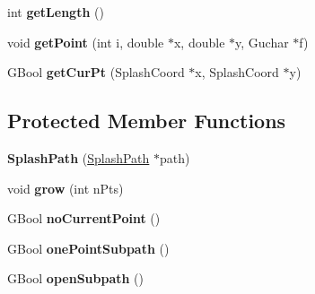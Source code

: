 \begin{DoxyCompactItemize}
\item 
\mbox{\label{class_splash_path_a14f01d774a1395441ddea6f189c72cfe}} 
int {\bfseries get\+Length} ()
\item 
\mbox{\label{class_splash_path_a73ee1734e488eb07ba15084ba93b9964}} 
void {\bfseries get\+Point} (int i, double $\ast$x, double $\ast$y, Guchar $\ast$f)
\item 
\mbox{\label{class_splash_path_aed1a1d48b1af67c88c6edd853c009830}} 
G\+Bool {\bfseries get\+Cur\+Pt} (Splash\+Coord $\ast$x, Splash\+Coord $\ast$y)
\end{DoxyCompactItemize}
\subsection*{Protected Member Functions}
\begin{DoxyCompactItemize}
\item 
\mbox{\label{class_splash_path_a2f7e9f88ece890db8e75d7a286fb2bc9}} 
{\bfseries Splash\+Path} (\hyperlink{class_splash_path}{Splash\+Path} $\ast$path)
\item 
\mbox{\label{class_splash_path_a4e4b0c67d36522ee7805e514f07db846}} 
void {\bfseries grow} (int n\+Pts)
\item 
\mbox{\label{class_splash_path_a874046f826cd78f50bec9de504d099bf}} 
G\+Bool {\bfseries no\+Current\+Point} ()
\item 
\mbox{\label{class_splash_path_a884f0f54baa2e776727c54c4641535ec}} 
G\+Bool {\bfseries one\+Point\+Subpath} ()
\item 
\mbox{\label{class_splash_path_ac050abec0358b79d797efc697e8816da}} 
G\+Bool {\bfseries open\+Subpath} ()
\end{DoxyCompactItemize}
